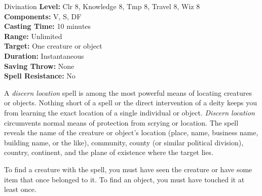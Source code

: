 {Divination}
{
	\textbf{Level:}
	Clr 8, Knowledge 8, Tmp 8, Travel 8, Wiz 8\\
	\textbf{Components:}
	V, S, DF\\
	\textbf{Casting Time:}
	10 minutes\\
	\textbf{Range:}
	Unlimited\\
	\textbf{Target:}
	One creature or object\\
	\textbf{Duration:}
	Instantaneous\\
	\textbf{Saving Throw:}
	None\\
	\textbf{Spell Resistance:}
	No\\
}
{
	A \emph{discern location} spell is among the most powerful means of locating creatures or objects. Nothing short of a  spell or the direct intervention of a deity keeps you from learning the exact location of a single individual or object. \emph{Discern location} circumvents normal means of protection from scrying or location. The spell reveals the name of the creature or object's location (place, name, business name, building name, or the like), community, county (or similar political division), country, continent, and the plane of existence where the target lies.

	To find a creature with the spell, you must have seen the creature or have some item that once belonged to it. To find an object, you must have touched it at least once.

}

